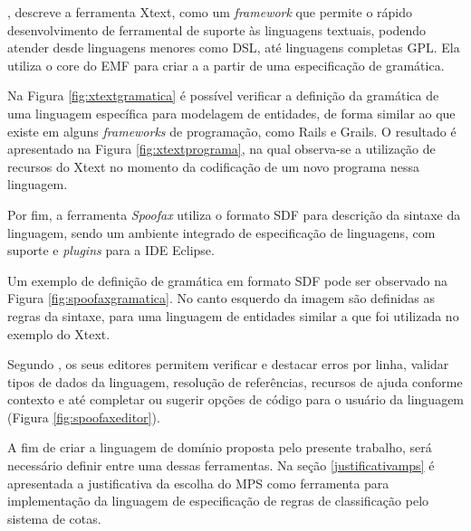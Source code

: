 , descreve a ferramenta Xtext, como um \textit{framework} que permite o rápido desenvolvimento de ferramental de suporte às linguagens textuais, podendo atender desde linguagens menores como \gls{DSL}, até linguagens completas \gls{GPL}. Ela utiliza o core do \gls{EMF} para criar a  a partir de uma especificação de gramática. 

Na Figura \ref{fig:xtextgramatica} é possível verificar a definição da gramática de uma linguagem específica para modelagem de entidades, de forma similar ao que existe em alguns \textit{frameworks} de programação, como Rails e Grails. O resultado é apresentado na Figura \ref{fig:xtextprograma}, na qual observa-se a utilização de recursos do Xtext no momento da codificação de um novo programa nessa linguagem.





\newpage
Por fim, a ferramenta \textit{Spoofax} utiliza o formato \gls{SDF} para descrição da sintaxe da linguagem, sendo um ambiente integrado de especificação de linguagens, com suporte e \textit{plugins} para a \gls{IDE} Eclipse. 

Um exemplo de definição de gramática em formato \gls{SDF} pode ser observado na Figura \ref{fig:spoofaxgramatica}. No canto esquerdo da imagem são definidas as regras da sintaxe, para uma linguagem de entidades similar a que foi utilizada no exemplo do Xtext. 




Segundo , os seus editores permitem verificar e destacar erros por linha, validar tipos de dados da linguagem, resolução de referências, recursos de ajuda conforme contexto e até completar ou sugerir opções de código para o usuário da linguagem (Figura \ref{fig:spoofaxeditor}). 



A fim de criar a linguagem de domínio proposta pelo presente trabalho, será necessário definir entre uma dessas ferramentas. Na seção \ref{justificativamps} é apresentada a justificativa da escolha do \gls{MPS} como ferramenta para implementação da linguagem de especificação de regras de classificação pelo sistema de cotas.